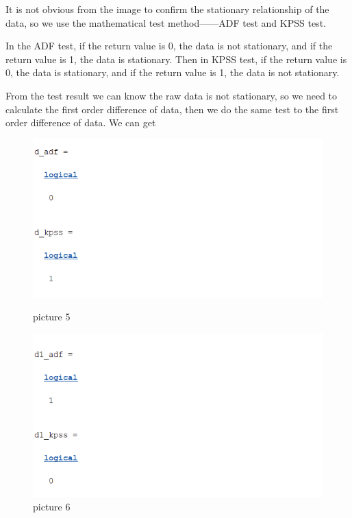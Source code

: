 \documentclass{apmcmthesis}
\begin{document}
It is not obvious from the image to confirm the stationary relationship of the data, so we use the mathematical test method——ADF test and KPSS test.

In the ADF test, if the return value is 0, the data is not stationary, and if the return value is 1, the data is stationary. Then in KPSS test, if the return value is 0, the data is stationary, and if the return value is 1, the data is not stationary.

From the test result we can know the raw data is not stationary, so we need to calculate the first order difference of data, then we do the same test to the first order difference of data. We can get
\begin{figure}[htbp]
  \begin{minipage}[t]{0.45\linewidth}
    \centering
    \includegraphics[scale=0.5]{order 1.png}
    \caption*{picture 5}
  \end{minipage}%
  \begin{minipage}[t]{0.45\linewidth}
    \centering
    \includegraphics[scale=0.5]{order 2.png}
    \caption*{picture 6}
  \end{minipage}
\end{figure}
\end{document}
